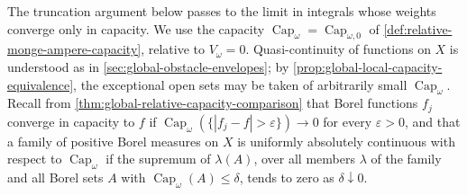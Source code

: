 The truncation argument below passes to the limit in integrals whose weights converge only in capacity. We use the capacity $\operatorname{Cap}_\omega=\operatorname{Cap}_{\omega,0}$ of \cref{def:relative-monge-ampere-capacity}, relative to $V_\omega=0$. Quasi-continuity of functions on $X$ is understood as in \cref{sec:global-obstacle-envelopes}; by \cref{prop:global-local-capacity-equivalence}, the exceptional open sets may be taken of arbitrarily small $\operatorname{Cap}_\omega$. Recall from \cref{thm:global-relative-capacity-comparison} that Borel functions $f_j$ converge in capacity to $f$ if $\operatorname{Cap}_\omega(\{|f_j-f|>\varepsilon\})\to0$ for every $\varepsilon>0$, and that a family of positive Borel measures on $X$ is uniformly absolutely continuous with respect to $\operatorname{Cap}_\omega$ if the supremum of $\lambda(A)$, over all members $\lambda$ of the family and all Borel sets $A$ with $\operatorname{Cap}_\omega(A)\leq\delta$, tends to zero as $\delta\downarrow0$.

